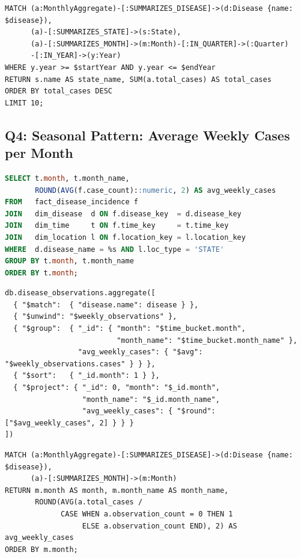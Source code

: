 \documentclass[12pt,a4paper]{article}
\begin{document}
\begin{lstlisting}[language=cypher, caption={Q3: Neo4j.}]
MATCH (a:MonthlyAggregate)-[:SUMMARIZES_DISEASE]->(d:Disease {name: $disease}),
      (a)-[:SUMMARIZES_STATE]->(s:State),
      (a)-[:SUMMARIZES_MONTH]->(m:Month)-[:IN_QUARTER]->(:Quarter)
      -[:IN_YEAR]->(y:Year)
WHERE y.year >= $startYear AND y.year <= $endYear
RETURN s.name AS state_name, SUM(a.total_cases) AS total_cases
ORDER BY total_cases DESC
LIMIT 10;
\end{lstlisting}


\subsection*{Q4: Seasonal Pattern: Average Weekly Cases per Month}

\begin{lstlisting}[language=SQL, caption={Q4: PostgreSQL.}]
SELECT t.month, t.month_name,
       ROUND(AVG(f.case_count)::numeric, 2) AS avg_weekly_cases
FROM   fact_disease_incidence f
JOIN   dim_disease  d ON f.disease_key  = d.disease_key
JOIN   dim_time     t ON f.time_key     = t.time_key
JOIN   dim_location l ON f.location_key = l.location_key
WHERE  d.disease_name = %s AND l.loc_type = 'STATE'
GROUP BY t.month, t.month_name
ORDER BY t.month;
\end{lstlisting}

\begin{lstlisting}[language={}, caption={Q4: MongoDB. \texttt{\$unwind} exposes individual weekly observations for averaging.}]
db.disease_observations.aggregate([
  { "$match":  { "disease.name": disease } },
  { "$unwind": "$weekly_observations" },
  { "$group":  { "_id": { "month": "$time_bucket.month",
                          "month_name": "$time_bucket.month_name" },
                 "avg_weekly_cases": { "$avg": "$weekly_observations.cases" } } },
  { "$sort":   { "_id.month": 1 } },
  { "$project": { "_id": 0, "month": "$_id.month",
                  "month_name": "$_id.month_name",
                  "avg_weekly_cases": { "$round": ["$avg_weekly_cases", 2] } } }
])
\end{lstlisting}

\begin{lstlisting}[language=cypher, caption={Q4: Neo4j.}]
MATCH (a:MonthlyAggregate)-[:SUMMARIZES_DISEASE]->(d:Disease {name: $disease}),
      (a)-[:SUMMARIZES_MONTH]->(m:Month)
RETURN m.month AS month, m.month_name AS month_name,
       ROUND(AVG(a.total_cases /
             CASE WHEN a.observation_count = 0 THEN 1
                  ELSE a.observation_count END), 2) AS avg_weekly_cases
ORDER BY m.month;
\end{lstlisting}
\end{document}
